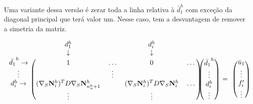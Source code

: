 Uma variante dessa versão é zerar toda a linha relativa à $\bar{d}^h_1$ com exceção da diagonal principal que terá valor um. Nesse caso, tem a desvantagem de remover a simetria da matriz. 

\begin{equation} \label{eq:diagident}
\begin{blockarray}{ccccc}
& d_1^h &  & d_i ^h & & \\
& \downarrow &  & \downarrow & & \\
\begin{block}{c(cccc)}
\bar{d_1}^h \rightarrow & 1 & \hdots & 0 & \hdots \\ 
\vdots                  &   & \vdots &             \\ 
d_i^h       \rightarrow & \kij{i}{n_u^h + 1}   &      & \kij{i}{i}   & \hdots \\
& \vdots &      & \vdots   &  \\
\end{block}
\end{blockarray} \begin{blockarray}{c}
 \\
 \\
\begin{block}{(c)}
\bar{d_1}^h \\
\vdots\\
d_i^h \\
\vdots  \\
\end{block}
\end{blockarray} \begin{blockarray}{c}
 \\
 \\
 \\
= \\
 \\
\end{blockarray} \begin{blockarray}{c}
 \\
 \\
\begin{block}{(c)}
 \bar{u}_1 \\
\vdots\\
f^\prime_i \\
\vdots  \\
\end{block}
\end{blockarray}
\end{equation}


